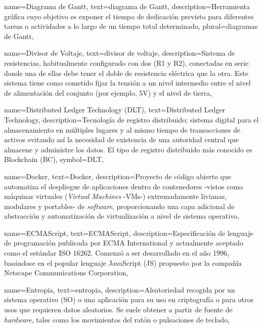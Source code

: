 {
    name={Diagrama de Gantt},
    text={diagrama de Gantt},
    description={Herramienta gráfica cuyo objetivo es exponer el tiempo de dedicación previsto para diferentes tareas o actividades a lo largo de un tiempo total determinado},
    plural={diagramas de Gantt},
}

{
    name={Divisor de Voltaje},
    text={divisor de voltaje},
    description={Sistema de resistencias, habitualmente configurado con dos (R1 y R2), conectadas en serie donde una de ellas debe tener el doble de resistencia eléctrica que la otra. Este sistema tiene como cometido fijar la tensión a un nivel intermedio entre el nivel de alimentación del conjunto (por ejemplo, 5V) y el nivel de tierra},
}

{
    name={Distributed Ledger Technology (DLT)},
    text={Distributed Ledger Technology},
    description={Tecnología de registro distribuido; sistema digital para el almacenamiento en múltiples lugares y al mismo tiempo de transacciones de activos evitando así la necesidad de existencia de una autoridad central que almacene y administre los datos. El tipo de registro distribuido más conocido es Blockchain (BC)},
    symbol={DLT},
}

{
    name={Docker},
    text={Docker},
    description={Proyecto de código abierto que automatiza el despliegue de aplicaciones dentro de contenedores -vistos como máquinas virtuales (\textit{Virtual Machines} -VMs-) extremadamente livianas, modulares y portables- de \textit{software}, proporcionando una capa adicional de abstracción y automatización de virtualización a nivel de sistema operativo},
}

{
    name={ECMAScript},
    text={ECMAScript},
    description={Especificación de lenguaje de programación publicada por ECMA International y actualmente aceptado como el estándar ISO 16262. Comenzó a ser desarrollado en el año 1996, basándose en el popular lenguaje JavaScript (JS) propuesto por la compañía Netscape Communications Corporation},
}

{
    name={Entropia},
    text={entropia},
    description={Aleatoriedad recogida por un sistema operativo (SO) o una aplicación para su uso en criptografía o para otros usos que requieren datos aleatorios. Se suele obtener a partir de fuente de \textit{hardware}, tales como los movimientos del ratón o pulsaciones de teclado},
}

